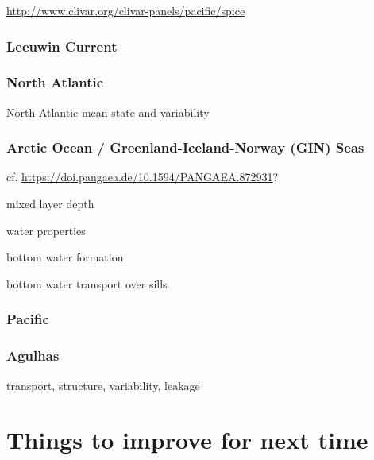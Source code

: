 \documentclass[11pt]{article}
\begin{document}
\url{http://www.clivar.org/clivar-panels/pacific/spice}

\subsubsection{Leeuwin Current}
\citet{WijeratnePattiaratchiProctor2018a}
\citet{FengZhangOkeMonselesanChamberlainMatearSchiller2016a}

\subsubsection{North Atlantic}
North Atlantic mean state \citet{DanabasogluYeagerBaileyBehrensBentsenBiBiastochBoningBozec2014a}
and variability \citet{DanabasogluYeagerKimBehrensBentsenBiBiastochBleckBoning2016a}

\subsubsection{Arctic Ocean / Greenland-Iceland-Norway (GIN) Seas}

cf. \citet{BehrendtSumataRabeSchauer2018a} \url{https://doi.pangaea.de/10.1594/PANGAEA.872931}?

mixed layer depth

water properties

bottom water formation

bottom water transport over sills

\citet{WangIlicakGerdesDrangeAksenovBaileyBentsenBiastochBozec2016b}
\citet{IlicakDrangeWangGerdesAksenovBaileyBentsenBiastochBozec2016a}

\subsubsection{Pacific}
\citet{TsengLinChenThompsonBentsenBoningBozecCassouChassignet2016a}

\subsubsection{Agulhas}
transport, structure, variability, leakage
 
 \newpage
 
\section{Things to improve for next time}
\end{document}
